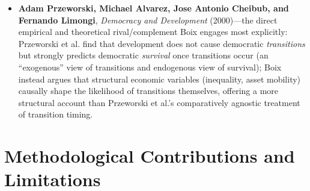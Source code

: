 \documentclass[12pt]{article}
\begin{document}
\begin{itemize}[leftmargin=*, itemsep=4pt]
    \item \textbf{Adam Przeworski, Michael Alvarez, Jose Antonio Cheibub, and Fernando Limongi}, \textit{Democracy and Development} (2000)---the direct empirical and theoretical rival/complement Boix engages most explicitly: Przeworski et al. find that development does not cause democratic \emph{transitions} but strongly predicts democratic \emph{survival} once transitions occur (an ``exogenous'' view of transitions and endogenous view of survival); Boix instead argues that structural economic variables (inequality, asset mobility) causally shape the likelihood of transitions themselves, offering a more structural account than Przeworski et al.'s comparatively agnostic treatment of transition timing.
\end{itemize}

\section{Methodological Contributions and Limitations}
\end{document}
